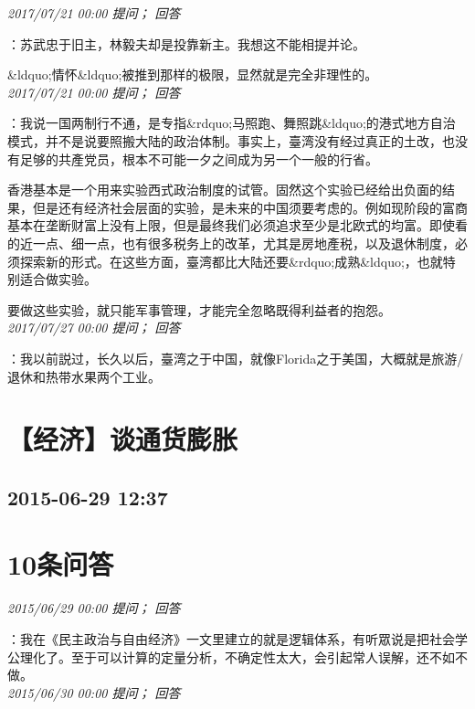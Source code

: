 \documentclass[twocolumn]{ctexart}
\begin{document}
\textit{\hfill\noindent\small 2017/07/21 00:00 提问； 回答}

：苏武忠于旧主，林毅夫却是投靠新主。我想这不能相提并论。

\&ldquo;情怀\&ldquo;被推到那样的极限，显然就是完全非理性的。\\

\textit{\hfill\noindent\small 2017/07/21 00:00 提问； 回答}

：我说一国两制行不通，是专指\&rdquo;马照跑、舞照跳\&ldquo;的港式地方自治模式，并不是说要照搬大陆的政治体制。事实上，臺湾没有经过真正的土改，也没有足够的共產党员，根本不可能一夕之间成为另一个一般的行省。

香港基本是一个用来实验西式政治制度的试管。固然这个实验已经给出负面的结果，但是还有经济社会层面的实验，是未来的中国须要考虑的。例如现阶段的富商基本在垄断财富上没有上限，但是最终我们必须追求至少是北欧式的均富。即使看的近一点、细一点，也有很多税务上的改革，尤其是房地產税，以及退休制度，必须探索新的形式。在这些方面，臺湾都比大陆还要\&rdquo;成熟\&ldquo;，也就特别适合做实验。

要做这些实验，就只能军事管理，才能完全忽略既得利益者的抱怨。\\

\textit{\hfill\noindent\small 2017/07/27 00:00 提问； 回答}

：我以前説过，长久以后，臺湾之于中国，就像Florida之于美国，大概就是旅游/退休和热带水果两个工业。\\


\section{【经济】谈通货膨胀}
\subsection{2015-06-29 12:37}


\section{10条问答}

\textit{\hfill\noindent\small 2015/06/29 00:00 提问； 回答}

：我在《民主政治与自由经济》一文里建立的就是逻辑体系，有听眾说是把社会学公理化了。至于可以计算的定量分析，不确定性太大，会引起常人误解，还不如不做。\\

\textit{\hfill\noindent\small 2015/06/30 00:00 提问； 回答}
\end{document}
